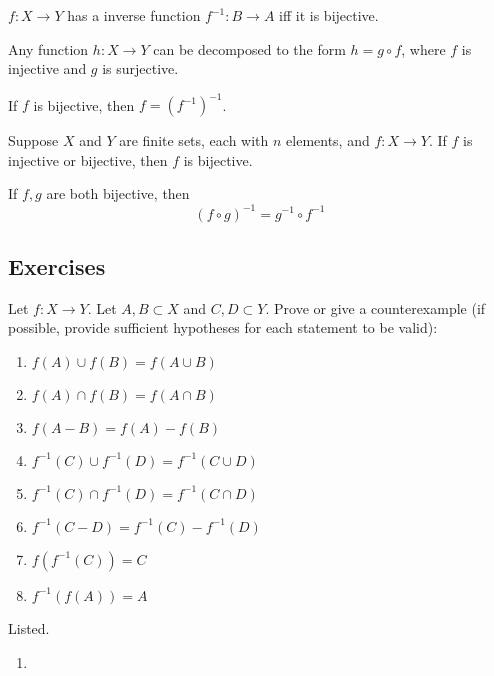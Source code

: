 \documentclass{article}
\begin{document}
    \begin{corollary}
      $f: X \rightarrow Y$ has a inverse function $f^{-1}: B \rightarrow A$ iff it is bijective. 
    \end{corollary}

    \begin{corollary}[Decomposition]
      Any function $h: X \rightarrow Y$ can be decomposed to the form $h = g \circ f$, where $f$ is injective and $g$ is surjective. 
    \end{corollary}

    \begin{theorem}
      If $f$ is bijective, then $f = (f^{-1})^{-1}$. 
    \end{theorem}

    \begin{theorem}
      Suppose $X$ and $Y$ are finite sets, each with $n$ elements, and $f: X \rightarrow Y$. If $f$ is injective or bijective, then $f$ is bijective. 
    \end{theorem} 

    \begin{theorem}
      If $f, g$ are both bijective, then 
      \begin{equation}
        (f \circ g)^{-1} = g^{-1} \circ f^{-1}
      \end{equation}
    \end{theorem}

  \subsection{Exercises}

    \begin{exercise}
      Let $f: X \to Y$. Let $A,B \subset X$ and $C,D \subset Y$. Prove or give a counterexample (if possible, provide sufficient hypotheses for each statement to be valid):
      \begin{enumerate}
        \item $f(A) \cup f(B) = f(A \cup B)$
        \item $f(A) \cap f(B) = f(A \cap B)$
        \item $f(A - B) = f(A) - f(B)$
        \item $f^{-1}(C) \cup f^{-1}(D) = f^{-1}(C \cup D)$
        \item $f^{-1}(C) \cap f^{-1}(D) = f^{-1}(C \cap D)$
        \item $f^{-1}(C - D) = f^{-1}(C) - f^{-1}(D)$
        \item $f(f^{-1}(C)) = C$
        \item $f^{-1}(f(A)) = A$
      \end{enumerate} 
    \end{exercise}
    \begin{solution}
      Listed. 
      \begin{enumerate}
        \item 
      \end{enumerate}
    \end{solution}
\end{document}
